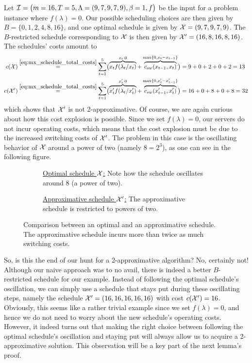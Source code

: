 \begin{exmpl}\label{exmpl:oscillating_schedule}
Let $\mathcal{I}=\bigl(m=16,T=5,\Lambda=(9,7,9,7,9),\beta=1,f\bigr)$ be the input for a problem instance where $f(\lambda)=0$. Our possible scheduling choices are then given by $B=\{0,1,2,4,8,16\}$, and one optimal schedule is given by $\mathcal{X}=(9,7,9,7,9)$. The $B$-restricted schedule corresponding to $\mathcal{X}$ is then given by $\mathcal{X}'=(16,8,16,8,16)$. The schedules' costs amount to
\begin{align*}
	c(\mathcal{X})&\stackrel{\eqref{eq:mx_schedule_total_costs}}{=}\sum\limits_{t=1}^{5}\bigl(\overbrace{x_tf(\lambda_t/x_t)}^{x_t\cdot 0}+\overbrace{c_{sw}(x_{t-1},x_t)}^{\max\{0,x_t-x_{t-1}\}}\bigr)=9+0+2+0+2=13\\
	c(\mathcal{X}')&\stackrel{\eqref{eq:mx_schedule_total_costs}}{=}\sum\limits_{t=1}^{5}\bigl(\overbrace{x_t'f(\lambda_t/x_t')}^{x_t'\cdot 0}+\overbrace{c_{sw}(x_{t-1}',x_t')}^{\max\{0,x_t'-x_{t-1}'\}}\bigr)=16+0+8+0+8=32
\end{align*}
which shows that $\mathcal{X}'$ is not 2-approximative. Of course, we are again curious about how this cost explosion is possible. Since we set $f(\lambda)=0$, our servers do not incur operating costs, which means that the cost explosion must be due to the increased switching costs of $\mathcal{X}'$. The problem in this case is the oscillating behavior of $\mathcal{X}$ around a power of two (namely $8=2^3$), as one can see in the following figure. 
\begin{figure}[H]
\captionsetup[subfigure]{labelformat=empty}
\begin{subfigure}[b]{0.48\textwidth}

	\caption{\underline{Optimal schedule $\mathcal{X}$:} Note how the schedule oscillates around 8 (a power of two).}
\end{subfigure}
\hfill
\begin{subfigure}[b]{0.48\textwidth}

	\caption{\underline{Approximative schedule $\mathcal{X}'$:} The approximative schedule is restricted to powers of two.}
\end{subfigure}
\caption{Comparison between an optimal and an approximative schedule. The approximative schedule incurs more than twice as much switching costs.}
\label{fig:adaption-schedule}
\end{figure}
\end{exmpl}
So, is this the end of our hunt for a 2-approximative algorithm? No, certainly not! Although our naive approach was to no avail, there is indeed a better $B$-restricted schedule for our example. Instead of following the optimal schedule's oscillation, we can simply use a schedule that stays put during these oscillating steps, namely the schedule $\mathcal{X}'=(16,16,16,16,16)$ with cost $c(\mathcal{X}')=16$. Obviously, this seems like a rather trivial example since we set $f(\lambda)=0$, and hence we do not need to worry about the new schedule's operating costs. However, it indeed turns out that making the right choice between following the optimal schedule's oscillation and staying put will always allow us to acquire a 2-approximative solution. This observation will be a key part of the next lemma's proof. 

